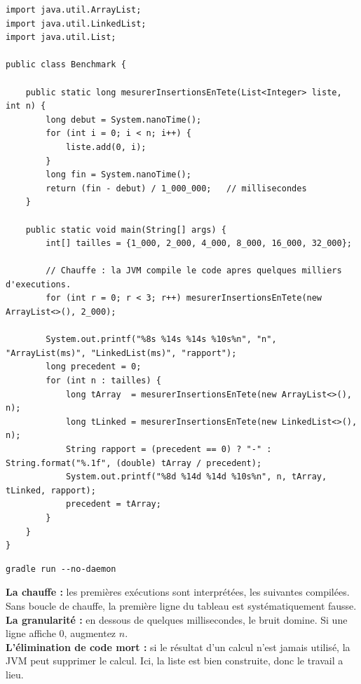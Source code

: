 \documentclass[11pt,a4paper]{article}
\begin{document}
\begin{lstlisting}[caption={\texttt{Benchmark.java} --- insertions en tête}]
import java.util.ArrayList;
import java.util.LinkedList;
import java.util.List;

public class Benchmark {

    public static long mesurerInsertionsEnTete(List<Integer> liste, int n) {
        long debut = System.nanoTime();
        for (int i = 0; i < n; i++) {
            liste.add(0, i);
        }
        long fin = System.nanoTime();
        return (fin - debut) / 1_000_000;   // millisecondes
    }

    public static void main(String[] args) {
        int[] tailles = {1_000, 2_000, 4_000, 8_000, 16_000, 32_000};

        // Chauffe : la JVM compile le code apres quelques milliers d'executions.
        for (int r = 0; r < 3; r++) mesurerInsertionsEnTete(new ArrayList<>(), 2_000);

        System.out.printf("%8s %14s %14s %10s%n", "n", "ArrayList(ms)", "LinkedList(ms)", "rapport");
        long precedent = 0;
        for (int n : tailles) {
            long tArray  = mesurerInsertionsEnTete(new ArrayList<>(), n);
            long tLinked = mesurerInsertionsEnTete(new LinkedList<>(), n);
            String rapport = (precedent == 0) ? "-" : String.format("%.1f", (double) tArray / precedent);
            System.out.printf("%8d %14d %14d %10s%n", n, tArray, tLinked, rapport);
            precedent = tArray;
        }
    }
}
\end{lstlisting}

\begin{lstlisting}[style=bash]
gradle run --no-daemon
\end{lstlisting}

\begin{attentionbox}
\textbf{La chauffe :} les premières exécutions sont interprétées, les
suivantes compilées. Sans boucle de chauffe, la première ligne du tableau
est systématiquement fausse.\\
\textbf{La granularité :} en dessous de quelques millisecondes, le bruit
domine. Si une ligne affiche $0$, augmentez $n$.\\
\textbf{L'élimination de code mort :} si le résultat d'un calcul n'est
jamais utilisé, la JVM peut supprimer le calcul. Ici, la liste est bien
construite, donc le travail a lieu.
\end{attentionbox}

\end{document}
